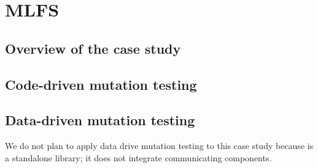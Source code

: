 \clearpage

\section{MLFS}
\label{sec:caseStudies:GSL:MLSF}

\subsection{Overview of the case study}



\subsection{Code-driven mutation testing}


\subsection{Data-driven mutation testing}

We do not plan to apply data drive mutation testing to this case study because is a standalone library; it does not integrate communicating components.



